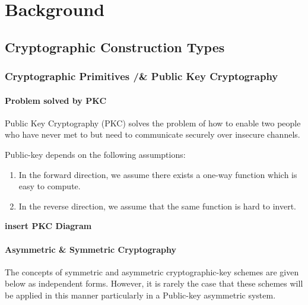 \chapter{Background}

\section{Cryptographic Construction Types}

\subsection{Cryptographic Primitives /& Public Key Cryptography}

\subsubsection{Problem solved by PKC}

Public Key Cryptography (PKC) solves the problem of how to enable two people who have never met to but need to communicate securely over insecure channels. 
 

Public-key depends on the following assumptions: 
\begin{enumerate}
 \item In the forward direction, we assume there exists a one-way function which is easy to compute.
 \item In the reverse direction, we assume that the same function is hard to invert. 
 \end{enumerate}
 
 
 
 
\textbf{insert PKC Diagram}

\subsubsection{Asymmetric & Symmetric Cryptography} 

The concepts of symmetric and asymmetric cryptographic-key schemes are given below as independent forms. However, it is rarely the case that these schemes will be applied in this manner particularly in a Public-key asymmetric system.



